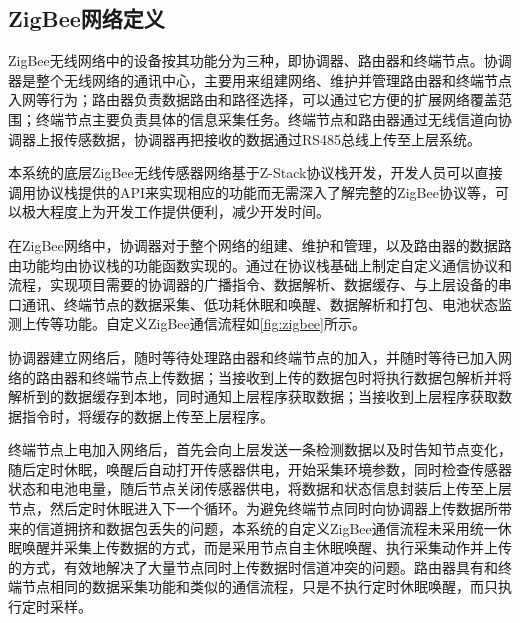 	\subsection{ZigBee网络定义}
	ZigBee无线网络中的设备按其功能分为三种，即协调器、路由器和终端节点。协调器是整个无线网络的通讯中心，主要用来组建网络、维护并管理路由器和终端节点入网等行为；路由器负责数据路由和路径选择，可以通过它方便的扩展网络覆盖范围；终端节点主要负责具体的信息采集任务。终端节点和路由器通过无线信道向协调器上报传感数据，协调器再把接收的数据通过RS485总线上传至上层系统。
	
本系统的底层ZigBee无线传感器网络基于Z-Stack协议栈开发，开发人员可以直接调用协议栈提供的API来实现相应的功能而无需深入了解完整的ZigBee协议等，可以极大程度上为开发工作提供便利，减少开发时间。
	\begin{figure}[!htp]
		\centering
	\end{figure}
在ZigBee网络中，协调器对于整个网络的组建、维护和管理，以及路由器的数据路由功能均由协议栈的功能函数实现的。通过在协议栈基础上制定自定义通信协议和流程，实现项目需要的协调器的广播指令、数据解析、数据缓存、与上层设备的串口通讯、终端节点的数据采集、低功耗休眠和唤醒、数据解析和打包、电池状态监测上传等功能。自定义ZigBee通信流程如\ref{fig:zigbee}所示。

协调器建立网络后，随时等待处理路由器和终端节点的加入，并随时等待已加入网络的路由器和终端节点上传数据；当接收到上传的数据包时将执行数据包解析并将解析到的数据缓存到本地，同时通知上层程序获取数据；当接收到上层程序获取数据指令时，将缓存的数据上传至上层程序。

终端节点上电加入网络后，首先会向上层发送一条检测数据以及时告知节点变化，随后定时休眠，唤醒后自动打开传感器供电，开始采集环境参数，同时检查传感器状态和电池电量，随后节点关闭传感器供电，将数据和状态信息封装后上传至上层节点，然后定时休眠进入下一个循环。为避免终端节点同时向协调器上传数据所带来的信道拥挤和数据包丢失的问题，本系统的自定义ZigBee通信流程未采用统一休眠唤醒并采集上传数据的方式，而是采用节点自主休眠唤醒、执行采集动作并上传的方式，有效地解决了大量节点同时上传数据时信道冲突的问题。路由器具有和终端节点相同的数据采集功能和类似的通信流程，只是不执行定时休眠唤醒，而只执行定时采样。

